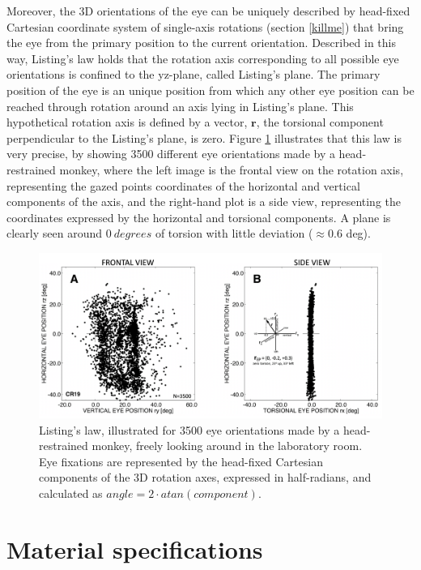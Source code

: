Moreover, the 3D orientations of the eye can be uniquely described by head-fixed Cartesian coordinate system of single-axis rotations (section \ref{killme}) that bring the eye from the primary position to the current orientation. Described in this way, Listing's law holds that the rotation axis corresponding to all possible eye orientations is confined to the yz-plane, called Listing's plane. The primary position of the eye is an unique position from which any other eye position can be reached through rotation around an axis lying in Listing's plane. This hypothetical rotation axis is defined by a vector, $ \mathbf{r}$, the torsional component perpendicular to the Listing's plane, is zero. 
Figure \ref{sec2:fig:monkey} illustrates that this law is very precise, by showing 3500 different eye orientations made by a head-restrained monkey, where the left image is the frontal view on the rotation axis, representing the gazed points coordinates of the horizontal and vertical components of the axis, and the right-hand plot is a side view, representing the coordinates expressed by the  horizontal and torsional components. A plane is clearly seen around $0 \ degrees$ of torsion with little deviation ($\approx 0.6$ deg).
\begin{figure}[ht]
	\centering
	\includegraphics[width=13cm]{images/ll.png}
	\caption[Listing’s law, illustrated for 3500 eye orientations made by a head-restrained monkey]{Listing’s law, illustrated for 3500 eye orientations made by a head-restrained monkey, freely looking around in the laboratory room. Eye fixations are represented by the head-fixed Cartesian components of the 3D rotation axes, expressed in half-radians, and calculated as $angle = 2 \cdot atan(component)$. \cite{donders}}
	\label{sec2:fig:monkey}
\end{figure}
\cite{donders} 


\chapter{Material specifications}

